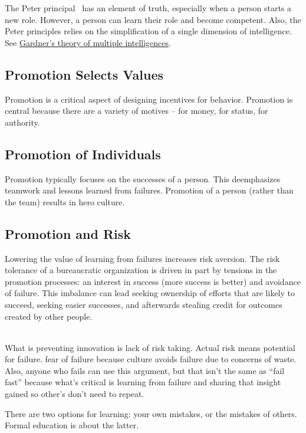 The Peter principal~\cite{1970_Peter} has an element of truth, especially when a person starts a new role. However, a person can learn their role and become competent. Also, the Peter principles relies on the simplification of a single dimension of intelligence. 
See \href{https://en.wikipedia.org/wiki/Theory_of_multiple_intelligences}{Gardner's theory of multiple intelligences}.


\subsection*{Promotion Selects Values}
Promotion is a critical aspect of designing incentives for behavior. Promotion is central because there are a variety of motives -- for money, for status, for authority. 


\subsection*{Promotion of Individuals}

Promotion typically focuses on the successes of a person. This deemphasizes teamwork and lessons learned from failures. 
Promotion of a person (rather than the team) results in hero culture.

\subsection*{Promotion and Risk}

Lowering the value of learning from failures increases risk aversion. The risk tolerance of a bureaucratic organization is driven in part by tensions in the promotion processes: an interest in success (more success is better) and avoidance of failure. This imbalance can lead seeking ownership of efforts that are likely to succeed, seeking easier successes, and afterwards stealing credit for outcomes created by other people. 

\ \\

What is preventing innovation is lack of risk taking. Actual risk means potential for failure. fear of failure because culture avoids failure due to concerns of waste. Also, anyone who fails can use this argument, but that isn't the same as ``fail fast'' because what's critical is learning from failure and sharing that insight gained so other's don't need to repeat. 

There are two options for learning: your own mistakes, or the mistakes of others. Formal education is about the latter.
